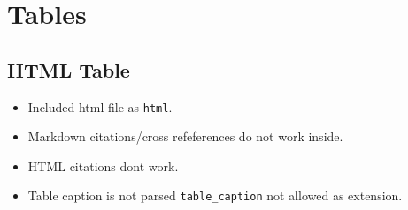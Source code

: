 \documentclass[
  12pt,
  british,
  paper=a4,
  twoside,
  titlepage=true,
  openright,
  abstract=on,
  toc=listofnumbered,
  numbers=noenddot,
  chapterprefix=true,
  headings=optiontohead,
  svgnames,
  dvipsnames]{scrreprt}
\providecommand{\tightlist}{%
  \setlength{\itemsep}{0pt}\setlength{\parskip}{0pt}}
\begin{document}
\hypertarget{tables}{%
\section{Tables}\label{tables}}

\hypertarget{html-table}{%
\subsection{HTML Table}\label{html-table}}

\begin{itemize}
\tightlist
\item
  Included html file as \texttt{html}.
\item
  Markdown citations/cross refeferences do not work inside.
\item
  HTML citations dont work.
\item
  Table caption is not parsed \texttt{table\_caption} not allowed as
  extension.
\end{itemize}
\end{document}
